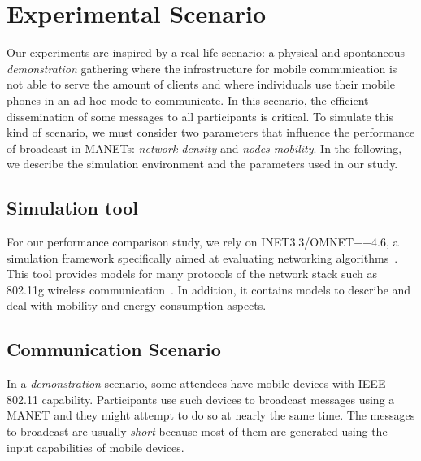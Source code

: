 \newcommand{\nodesNumber}{500}
\newcommand{\densitiesNumber}{8}
\newcommand{\nrMessages}{100}

\section{Experimental Scenario}
\label{sec:scenarios}

%
Our experiments are inspired by a real life scenario: a physical and spontaneous \emph{demonstration} gathering where the infrastructure for mobile communication is not able to serve the amount of clients and where individuals use their mobile phones in an ad-hoc mode to communicate.
%
In this scenario, the efficient dissemination of some messages to all participants is critical.
%
To simulate this kind of scenario, we must consider two parameters that influence the performance of broadcast in MANETs: \textit{network density} and \textit{nodes mobility}.
%
%
In the following, we describe the simulation environment and the parameters used in our study.

\subsection*{Simulation tool}

For our performance comparison study, we rely on INET3.3/OMNET++4.6, a simulation framework specifically aimed at evaluating networking algorithms~\cite{Varga:2008:OOS:1416222.1416290}.
%
This tool provides models for many protocols of the network stack such as 802.11g wireless communication~\cite{10.4108/ICST.SIMUTOOLS2009.5585}.
%
In addition, it contains models to describe and deal with mobility and energy consumption aspects.
%

\subsection*{Communication Scenario}

%
In a \textit{demonstration} scenario, some attendees have mobile devices with IEEE 802.11 capability.
%
Participants use such devices to broadcast messages using a MANET and they might attempt to do so at nearly the same time.
%
The messages to broadcast are usually \textit{short} because most of them are generated using the input capabilities of mobile devices.
%

